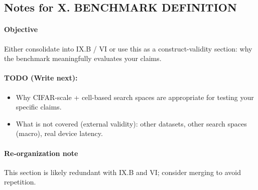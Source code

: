 \subsection*{Notes for X. BENCHMARK DEFINITION}
\paragraph{Objective}
Either consolidate into IX.B / VI or use this as a construct-validity section: why the benchmark meaningfully evaluates your claims.

\paragraph{TODO (Write next):}
\begin{itemize}
  \item Why CIFAR-scale + cell-based search spaces are appropriate for testing your specific claims.
  \item What is not covered (external validity): other datasets, other search spaces (macro), real device latency.
\end{itemize}

\paragraph{Re-organization note}
This section is likely redundant with IX.B and VI; consider merging to avoid repetition.
